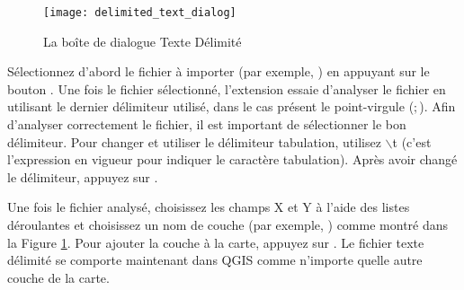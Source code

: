 \begin{figure}[ht]
   \begin{center}
   \texttt{[image: delimited\_text\_dialog]}
   \caption{La boîte de dialogue Texte Délimité \nixcaption}\label{fig:delim_text_plugin_dialog}
   \end{center}  
\end{figure}

Sélectionnez d'abord le fichier à importer (par exemple, ) 
en appuyant sur le bouton . Une fois le fichier 
sélectionné, l'extension essaie d'analyser le fichier en utilisant le dernier 
délimiteur utilisé, dans le cas présent le point-virgule (\mbox{$;$}). 
Afin d'analyser correctement le fichier, il est important de sélectionner le 
bon délimiteur. Pour changer et utiliser le délimiteur tabulation, utilisez \mbox{$\backslash$}t 
(c'est l'expression en vigueur pour indiquer le caractère tabulation).
Après avoir changé le délimiteur, appuyez sur .

Une fois le fichier analysé, choisissez les champs X et Y à l'aide des listes 
déroulantes et choisissez un nom de couche (par exemple,  ) 
comme montré dans la Figure \ref{fig:delim_text_plugin_dialog}. Pour ajouter 
la couche à la carte, appuyez sur . Le fichier texte délimité se 
comporte maintenant dans QGIS comme n'importe quelle autre couche de la carte.
